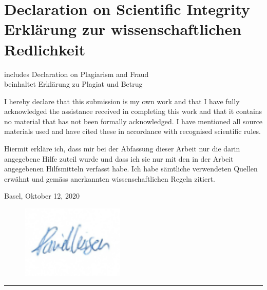 \chapter[Declaration on Scientific Integrity]{Declaration on Scientific Integrity\\Erklärung zur wissenschaftlichen Redlichkeit}
\label{DeclarationOfAuthorship}

includes Declaration on Plagiarism and Fraud \\
beinhaltet Erklärung zu Plagiat und Betrug \vspace{1cm}

\authorsint

\immatriculnrint

\titleint

\thesistypeint

I hereby declare that this submission is my own work and that I have fully acknowledged the assistance received in completing this work and that it contains no material that has not been formally acknowledged. 
I have mentioned all source materials used and have cited these in accordance with recognised scientific rules.

\vspace{0.3cm}

Hiermit erkläre ich, dass mir bei der Abfassung dieser Arbeit nur die darin angegebene 
Hilfe zuteil wurde und dass ich sie nur mit den in der Arbeit angegebenen Hilfsmitteln 
verfasst habe. Ich habe sämtliche verwendeten Quellen erwähnt und gemäss anerkannten wissenschaftlichen Regeln zitiert. 


\vspace*{0.5cm}

Basel, Oktober 12, 2020
\vspace*{0.25cm}

\begin{flushright}
\begin{figure}
    \raggedleft
    \includegraphics[]{UNTERSCHRIFT.PNG}
\end{figure}
\rule{75mm}{0.4pt} \\
\end{flushright}
